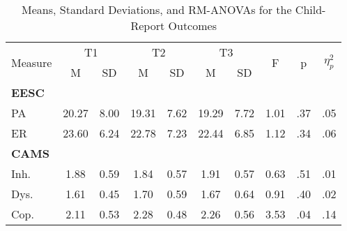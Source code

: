 \begin{table}[H]
\centering
\caption{Means, Standard Deviations, and RM-ANOVAs for the Child-Report Outcomes}
\label{tab:child_outcomes}
\begin{tabular}{lccccccccc}
\toprule
\multirow{2}{*}{Measure} & \multicolumn{2}{c}{T1} & \multicolumn{2}{c}{T2} & \multicolumn{2}{c}{T3} & \multirow{2}{*}{F} & \multirow{2}{*}{p} & \multirow{2}{*}{$\eta_p^2$} \\
 & M & SD & M & SD & M & SD & & & \\
\midrule
\textbf{EESC} & & & & & & & & & \\
\quad PA & 20.27 & 8.00 & 19.31 & 7.62 & 19.29 & 7.72 & 1.01 & .37 & .05 \\
\quad ER & 23.60 & 6.24 & 22.78 & 7.23 & 22.44 & 6.85 & 1.12 & .34 & .06 \\
\textbf{CAMS} & & & & & & & & & \\
\quad Inh. & 1.88 & 0.59 & 1.84 & 0.57 & 1.91 & 0.57 & 0.63 & .51 & .01 \\
\quad Dys. & 1.61 & 0.45 & 1.70 & 0.59 & 1.67 & 0.64 & 0.91 & .40 & .02 \\
\quad Cop. & 2.11 & 0.53 & 2.28 & 0.48 & 2.26 & 0.56 & 3.53 & .04 & .14 \\
\bottomrule
\end{tabular}
\end{table}
